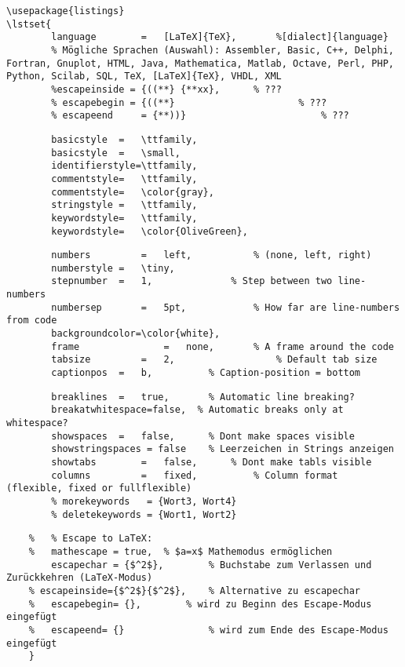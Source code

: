 \begin{lstlisting}
\usepackage{listings}
\lstset{
		language		=	[LaTeX]{TeX},		%[dialect]{language}
		% Mögliche Sprachen (Auswahl): Assembler, Basic, C++, Delphi, Fortran, Gnuplot, HTML, Java, Mathematica, Matlab, Octave, Perl, PHP, Python, Scilab, SQL, TeX, [LaTeX]{TeX}, VHDL, XML
		%escapeinside = {((**} {**xx},		% ???
		% escapebegin = {((**} 						% ???
		% escapeend		= {**))}						% ???
\end{lstlisting}
\vspace{-1\baselineskip}
\begin{lstlisting}
		basicstyle	=	\ttfamily,
		basicstyle	=	\small,
		identifierstyle=\ttfamily,
		commentstyle=	\ttfamily,
		commentstyle=	\color{gray},
		stringstyle =	\ttfamily,
		keywordstyle=	\ttfamily,
		keywordstyle=	\color{OliveGreen},
\end{lstlisting}
\vspace{-1\baselineskip}
\begin{lstlisting}
		numbers			=	left,  			% (none, left, right)
		numberstyle	=	\tiny, 			
		stepnumber	=	1,    			% Step between two line-numbers
		numbersep		=	5pt,  			% How far are line-numbers from code
		backgroundcolor=\color{white},		
		frame				=	none,       % A frame around the code
		tabsize			=	2,					% Default tab size
		captionpos	=	b,          % Caption-position = bottom
\end{lstlisting}

\vspace{-1\baselineskip}
\begin{lstlisting}
		breaklines	=	true,       % Automatic line breaking?
		breakatwhitespace=false,  % Automatic breaks only at whitespace?
		showspaces	=	false,      % Dont make spaces visible
		showstringspaces = false	% Leerzeichen in Strings anzeigen
		showtabs		=	false,      % Dont make tabls visible
		columns			=	fixed, 			% Column format  (flexible, fixed or fullflexible)
		% morekeywords   = {Wort3, Wort4}
		% deletekeywords = {Wort1, Wort2}

\end{lstlisting}
\vspace{-1\baselineskip}
\begin{lstlisting}
	%	% Escape to LaTeX:
	%	mathescape = true, 	% $a=x$ Mathemodus ermöglichen
		escapechar = {$^2$},		% Buchstabe zum Verlassen und Zurückkehren (LaTeX-Modus)
	% escapeinside={$^2$}{$^2$},	% Alternative zu escapechar
	%	escapebegin= {},		% wird zu Beginn des Escape-Modus eingefügt
	%	escapeend= {}				% wird zum Ende des Escape-Modus eingefügt
	}
\end{lstlisting}
\lstset{mathescape = false}

